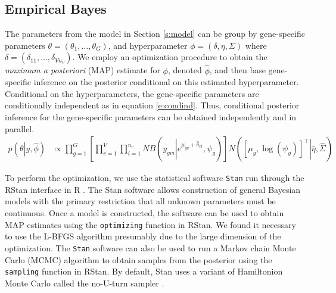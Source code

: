 \documentclass[useAMS,usenatbib,referee]{biom}
\begin{document}

\subsection{Empirical Bayes}
\label{s:ebayes}


The parameters from the model in Section \ref{s:model} can be group by gene-specific parameters $\theta = (\theta_1,\ldots,\theta_G)$, and hyperparameter $\phi = (\delta,\eta, \Sigma)$ where $\delta = (\delta_{11},\ldots,\delta_{Vn_V})$. We employ an optimization procedure to obtain the \emph{maximum a posteriori} (MAP) estimate for $\phi$, denoted $\hat{\phi}$, and then base gene-specific inference on the posterior conditional on this estimated hyperparameter. Conditional on the hyperparameters, the gene-specific parameters are conditionally independent as in equation \eqref{e:condind}. Thus, conditional posterior inference for the gene-specific parameters can be obtained independently and in parallel.
\begin{align}
p\left(\theta\left|y,\hat{\phi}\right.\right) 
&\propto \prod_{g=1}^G \left[ \prod_{v=1}^V \prod_{i=1}^{n_v} NB\left(y_{gvi}\left|e^{\mu_{gv}+\hat{\delta}_{vi}},\psi_g\right.\right) \right] N\left(\left.\left[\mu_g, \log(\psi_g) \right]^\top\right|\hat{\eta}, \hat{\Sigma} \right) 
\label{e:condind}
\end{align}


To perform the optimization, we use the statistical software {\tt Stan} \citep{stan-software:2014} run through the RStan interface \citep{rstan-software:2014} in R \citep{R2014}. The Stan software allows construction of general Bayesian models with the primary restriction that all unknown parameters must be continuous. Once a model is constructed, the software can be used to obtain MAP estimates \cite[Section 50.3,][]{stan-manual:2014} using the {\tt optimizing} function in RStan. We found it necessary to use the L-BFGS algorithm \cite[Section 55,][]{stan-manual:2014} presumably due to the large dimension of the optimization. The {\tt Stan} software can also be used to run a Markov chain Monte Carlo (MCMC) algorithm to obtain samples from the posterior using the {\tt sampling} function in RStan. By default, Stan uses a variant of Hamiltonion Monte Carlo \citep{neal2011mcmc} called the no-U-turn sampler \citep{hoffman2013no}. 
\end{document}
